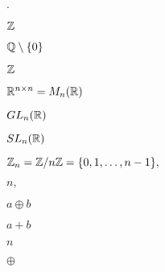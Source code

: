 \documentclass[10pt]{book}
\begin{document}
\begin{mdSnippets}
\begin{mdInlineSnippet}[571ca3d7c7a5d375a429ff5a90bc5099]
$\cdot$\end{mdInlineSnippet}%
\begin{mdInlineSnippet}[1458a437b3c6456f9ebf61d46c9ed13e]%
$\mathbb{Z}$\end{mdInlineSnippet}%
\begin{mdInlineSnippet}[fb229492be0cd19596dfe35ce7ef690f]%
$\mathbb{Q} \setminus \{0\}$\end{mdInlineSnippet}%
\begin{mdInlineSnippet}[1458a437b3c6456f9ebf61d46c9ed13e]%
$\mathbb{Z}$\end{mdInlineSnippet}%
\begin{mdInlineSnippet}%
$\mathbb{R}^{n \times n} = M_n(\mathbb{R})$\end{mdInlineSnippet}%
\begin{mdInlineSnippet}[16f20e52f211dc23b3ecfc45e052cf72]%
$GL_n(\mathbb{R})$\end{mdInlineSnippet}%
\begin{mdInlineSnippet}[00ed0a629e5e7aa4e2cd9a041ebd9e67]%
$SL_n(\mathbb{R})$\end{mdInlineSnippet}%
\begin{mdInlineSnippet}%
$\mathbb{Z}_n = \mathbb{Z} / n\mathbb{Z} = \{0, 1, \dots, n-1\},$\end{mdInlineSnippet}%
\begin{mdInlineSnippet}[1a58f249932a2915e61842f01ae0feca]%
$n,$\end{mdInlineSnippet}%
\begin{mdInlineSnippet}[121dc4263a56311cf360403b36a43e0f]%
$a \oplus b$\end{mdInlineSnippet}%
\begin{mdInlineSnippet}[65c884f742c8591808a121a828bc09f8]%
$a+b$\end{mdInlineSnippet}%
\begin{mdInlineSnippet}[7b8b965ad4bca0e41ab51de7b31363a1]%
$n$\end{mdInlineSnippet}%
\begin{mdInlineSnippet}[61a41642d26f221806dcbccfcebc2ef8]%
$\oplus$\end{mdInlineSnippet}%
\begin{mdInlineSnippet}[26b17225b626fb9238849fd60eabdf60]%

\end{mdInlineSnippet}
\end{mdSnippets}
\end{document}
